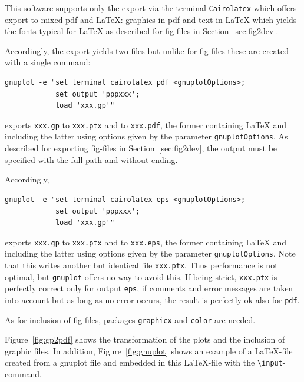 \documentclass[12pt]{book}
\begin{document}
This software supports only the export via the terminal \texttt{Cairolatex} 
which offers export to mixed pdf and \LaTeX: 
graphics in pdf and text in \LaTeX{}
which yields the fonts typical for \LaTeX{} 
as described for fig-files in Section~\ref{sec:fig2dev}. 

Accordingly, the export yields two files 
but unlike for fig-files these are created with a single command: 
%
\begin{verbatim}
gnuplot -e "set terminal cairolatex pdf <gnuplotOptions>;
            set output 'pppxxx';
            load 'xxx.gp'"
\end{verbatim}
%
exports \texttt{xxx.gp} to \texttt{xxx.ptx} and to \texttt{xxx.pdf}, 
the former containing \LaTeX{} and including the latter 
using options given by the parameter \texttt{gnuplotOptions}. 
As described for exporting fig-files in Section~\ref{sec:fig2dev}, 
the output must be specified with the full path and without ending. 

Accordingly, 
%
\begin{verbatim}
gnuplot -e "set terminal cairolatex eps <gnuplotOptions>;
            set output 'pppxxx';
            load 'xxx.gp'"
\end{verbatim}
%
exports \texttt{xxx.gp} to \texttt{xxx.ptx} and to \texttt{xxx.eps}, 
the former containing \LaTeX{} and including the latter 
using options given by the parameter \texttt{gnuplotOptions}. 
Note that this writes another but identical file \texttt{xxx.ptx}. 
Thus performance is not optimal, but \texttt{gnuplot} offers no way to avoid this. 
If being strict, \texttt{xxx.ptx} is perfectly correct only for output \texttt{eps}, 
if comments and error messages are taken into account 
but as long as no error occurs, the result is perfectly ok also for \texttt{pdf}. 

As for inclusion of fig-files, 
packages \texttt{graphicx} and \texttt{color} are needed. 



Figure~\ref{fig:gp2pdf} shows the transformation of the plots 
and the inclusion of graphic files. 
In addition, Figure~\ref{fig:gnuplot} shows an example of a \LaTeX-file 
created from a gnuplot file 
and embedded in this \LaTeX-file with the {\tt\textbackslash input}-command. 
\end{document}
